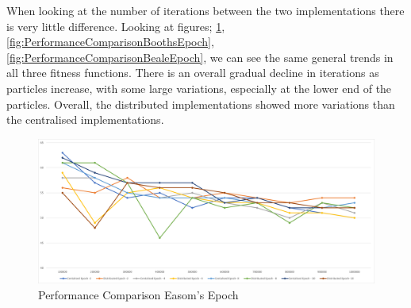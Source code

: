 \documentclass[oneside,12pt]{book}
\begin{document}
\begin{table}[H]
  \caption{TTS Results for 1,000,000 Particles}    
  \label{tab:TTSOneMillion}%
\end{table}%

When looking at the number of iterations between the two implementations there is very little difference. Looking at figures; \ref{fig:PerformanceComparisonEasomEpoch}, \ref{fig:PerformanceComparisonBoothsEpoch}, \ref{fig:PerformanceComparisonBealeEpoch}, we can see the same general trends in all three fitness functions. There is an overall gradual decline in iterations as particles increase, with some large variations, especially at the lower end of the particles. Overall, the distributed implementations showed more variations than the centralised implementations. 

\begin{figure}[H]
    \centering
    \includegraphics[scale=0.45]{Images/Graphs/PerformanceComparisonEasomEpoch.png}
    \caption{Performance Comparison Easom's Epoch}
    \label{fig:PerformanceComparisonEasomEpoch}
\end{figure}
\end{document}
